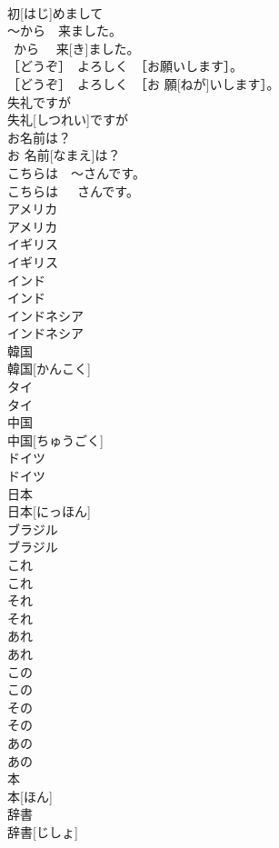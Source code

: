 \documentclass[8pt]{extreport}
\begin{document}
\begin{CJK}{UTF8}{min}
\\	初[はじ]めまして	
\\	～から　来ました。	
\\	~から　 来[き]ました。	
\\	［どうぞ］　よろしく　［お願いします］。	
\\	［どうぞ］　よろしく　［お 願[ねが]いします］。	
\\	失礼ですが	
\\	失礼[しつれい]ですが	
\\	お名前は？	
\\	お 名前[なまえ]は？	
\\	こちらは　～さんです。	
\\	こちらは　~さんです。	
\\	アメリカ	
\\	アメリカ	
\\	イギリス	
\\	イギリス	
\\	インド	
\\	インド	
\\	インドネシア	
\\	インドネシア	
\\	韓国	
\\	韓国[かんこく]	
\\	タイ	
\\	タイ	
\\	中国	
\\	中国[ちゅうごく]	
\\	ドイツ	
\\	ドイツ	
\\	日本	
\\	日本[にっほん]	
\\	ブラジル	
\\	ブラジル	
\\	これ	
\\	これ	
\\	それ	
\\	それ	
\\	あれ	
\\	あれ	
\\	この　
\\	この　
\\	その　
\\	その　
\\	あの　
\\	あの　
\\	本	
\\	本[ほん]	
\\	辞書	
\\	辞書[じしょ]	

\end{CJK}
\end{document}
